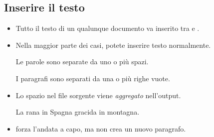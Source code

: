 \documentclass{beamer}
\begin{document}
\subsection{Inserire il testo}
\begin{frame}[fragile]{\insertsubsection{}}
\small
\begin{itemize}
\item Tutto il testo di un qualunque documento va inserito tra 
e .
\item Nella maggior parte dei casi, potete inserire testo normalmente.
\begin{exampletwouptiny}
Le parole sono separate da uno
o pi\`u spazi.

I paragrafi sono separati da una
o pi\`u righe vuote.
\end{exampletwouptiny}
\item Lo spazio nel file sorgente viene \emph{aggregato} nell'output.
\begin{exampletwouptiny}
La   rana       in Spagna
gracida in		 montagna.
\end{exampletwouptiny}
\item \keystrokebftt{\bs\bs} forza l'andata a capo, ma non crea un nuovo paragrafo.
\end{itemize}
\end{frame}
\end{document}
